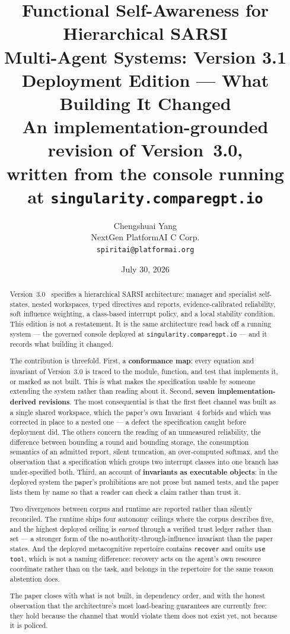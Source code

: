 \documentclass[11pt]{article}
\title{\LARGE Functional Self-Awareness for Hierarchical SARSI\\
\LARGE Multi-Agent Systems: Version 3.1\\[6pt]
\Large Deployment Edition --- What Building It Changed\\[10pt]
\large An implementation-grounded revision of Version~3.0,\\
\large written from the console running at \texttt{singularity.comparegpt.io}}
\author{Chengshuai Yang\\
\small NextGen PlatformAI C Corp.\\
\small \texttt{spiritai@platformai.org}}
\date{July 30, 2026}
\newcommand{\code}[1]{\texttt{\small #1}}
\begin{document}
\maketitle
\thispagestyle{empty}

\begin{abstract}
\noindent
Version~3.0~\citep{yang2026hierarchical} specifies a hierarchical SARSI architecture: manager and specialist self-states, nested workspaces, typed directives and reports, evidence-calibrated reliability, soft influence weighting, a class-based interrupt policy, and a local stability condition. This edition is not a restatement. It is the same architecture read back off a running system --- the governed console deployed at \texttt{singu\-larity.compare\-gpt.io} --- and it records what building it changed.

The contribution is threefold. First, a \textbf{conformance map}: every equation and invariant of Version~3.0 is traced to the module, function, and test that implements it, or marked as not built. This is what makes the specification usable by someone extending the system rather than reading about it. Second, \textbf{seven implementation-derived revisions}. The most consequential is that the first fleet channel was built as a single shared workspace, which the paper's own Invariant~4 forbids and which was corrected in place to a nested one --- a defect the specification caught before deployment did. The others concern the reading of an unmeasured reliability, the difference between bounding a round and bounding storage, the consumption semantics of an admitted report, silent truncation, an over-computed softmax, and the observation that a specification which groups two interrupt classes into one branch has under-specified both. Third, an account of \textbf{invariants as executable objects}: in the deployed system the paper's prohibitions are not prose but named tests, and the paper lists them by name so that a reader can check a claim rather than trust it.

Two divergences between corpus and runtime are reported rather than silently reconciled. The runtime ships four autonomy ceilings where the corpus describes five, and the highest deployed ceiling is \emph{earned} through a verified trust ledger rather than set --- a stronger form of the no-authority-through-influence invariant than the paper states. And the deployed metacognitive repertoire contains \code{recover} and omits \code{use tool}, which is not a naming difference: recovery acts on the agent's own resource coordinate rather than on the task, and belongs in the repertoire for the same reason abstention does.

The paper closes with what is not built, in dependency order, and with the honest observation that the architecture's most load-bearing guarantees are currently free: they hold because the channel that would violate them does not exist yet, not because it is policed.
\end{abstract}
\end{document}

